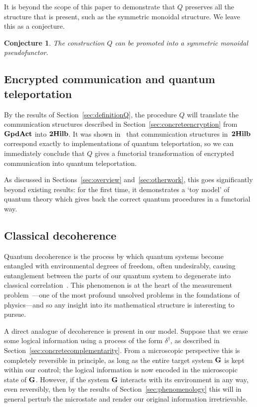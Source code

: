 \documentclass[a4paper,12pt]{article}
\newtheorem{conjecture}[theorem]{Conjecture}
\theoremstyle{definition}
\newcommand\cat[1]{{\ensuremath{\bf #1}}}
\renewcommand{\-}[0]{\nobreakdash-\hspace{0pt}}
\newcommand\GA{\cat{GpdAct}{}}
\begin{document}
It is beyond the scope of this paper to demonstrate that $Q$ preserves all the structure that is present, such as the symmetric monoidal structure. We leave this as a conjecture.
\begin{conjecture} The construction $Q$ can be promoted into a symmetric monoidal pseudofunctor.
\end{conjecture}

\subsection{Encrypted communication and quantum teleportation}
\label{sec:teleportation}

\noindent
By the results of Section~\ref{sec:definitionQ}, the procedure $Q$ will translate the communication structures described in Section~\ref{sec:concreteencryption} from $\GA$ into \cat{2Hilb}. It was shown in~\cite{v12-hqt, v12-hsqp} that communication structures in~\cat{2Hilb} correspond exactly to implementations of quantum teleportation, so we can immediately conclude that $Q$ gives a functorial transformation of encrypted communication into quantum teleportation.

As discussed in Sections~\ref{sec:overview} and~\ref{sec:otherwork}, this goes significantly beyond existing results: for the first time, it demonstrates a `toy model' of quantum theory which  gives back the correct quantum procedures in a functorial way.

\subsection{Classical decoherence}
\label{sec:decoherence}

\noindent
Quantum decoherence is the process by which quantum systems become entangled with environmental degrees of freedom, often undesirably, causing entanglement between the parts of our quantum system to degenerate into classical correlation~\cite{decoherence}. This phenomenon is at the heart of the measurement problem~\cite{s05-decoherence}---one of the most profound unsolved problems in the foundations of physics---and so any insight into its mathematical structure is interesting to pursue.

A direct analogue of decoherence is present in our model. Suppose that we erase some logical information using a process of the form $\delta ^\dag$, as described in Section~\ref{sec:concretecomplementarity}. From a microscopic perspective this is completely reversible in principle, as long as the entire target system $\cat G$ is kept within our control; the logical information is now encoded in the microscopic state of \cat G. However, if the system \cat G interacts with its environment in any way, even reversibly, then by the results of Section~\ref{sec:phenomenology} this will in general perturb the microstate and render our original information irretrievable.
\end{document}
